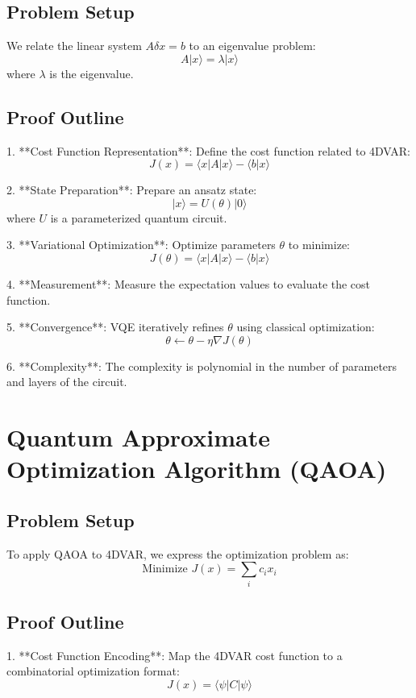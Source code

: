 \documentclass{article}
\begin{document}
\subsection{Problem Setup}

We relate the linear system \( A \delta x = b \) to an eigenvalue problem:
\[
A |x\rangle = \lambda |x\rangle
\]
where \( \lambda \) is the eigenvalue.

\subsection{Proof Outline}

1. **Cost Function Representation**: Define the cost function related to 4DVAR:
   \[
   J(x) = \langle x | A | x\rangle - \langle b | x\rangle
   \]

2. **State Preparation**: Prepare an ansatz state:
   \[
   |x\rangle = U(\theta) |0\rangle
   \]
   where \( U \) is a parameterized quantum circuit.

3. **Variational Optimization**: Optimize parameters \( \theta \) to minimize:
   \[
   J(\theta) = \langle x | A | x\rangle - \langle b | x\rangle
   \]

4. **Measurement**: Measure the expectation values to evaluate the cost function.

5. **Convergence**: VQE iteratively refines \( \theta \) using classical optimization:
   \[
   \theta \gets \theta - \eta \nabla J(\theta)
   \]

6. **Complexity**: The complexity is polynomial in the number of parameters and layers of the circuit.


\section{Quantum Approximate Optimization Algorithm (QAOA)}

\subsection{Problem Setup}

To apply QAOA to 4DVAR, we express the optimization problem as:
\[
\text{Minimize } J(x) = \sum_{i} c_i x_i
\]

\subsection{Proof Outline}

1. **Cost Function Encoding**: Map the 4DVAR cost function to a combinatorial optimization format:
   \[
   J(x) = \langle \psi | C | \psi \rangle
   \]
\end{document}
